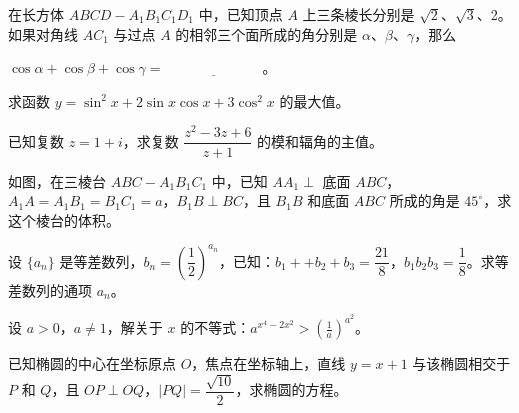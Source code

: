 \begin{question}

在长方体 $ABCD-A_1B_1C_1D_1$ 中，已知顶点 $A$ 上三条棱长分别是 $\sqrt2$、$\sqrt3$、2。如果对角线 $AC_1$ 与过点 $A$ 的相邻三个面所成的角分别是 $\alpha$、$\beta$、$\gamma$，那么

$\cos\alpha+\cos\beta+\cos\gamma=\underline{\hspace{7em}}$。

\end{question}
\begin{question}

求函数 $y=\sin^2x+2\sin x\cos x+3\cos^2x$ 的最大值。

\end{question}
\begin{question}

已知复数 $z=1+i$，求复数 $\dfrac{z^2-3z+6}{z+1}$ 的模和辐角的主值。

\Needspace{0.4\textheight}
\end{question}
\begin{question}

如图，在三棱台 $ABC-A_1B_1C_1$ 中，已知 $AA_1\perp$ 底面 $ABC$，$A_1A=A_1B_1=B_1C_1=a$，$B_1B\perp BC$，且 $B_1B$ 和底面 $ABC$ 所成的角是 $45^\circ$，求这个棱台的体积。
\nopagebreak[4]
\begin{center}\end{center}
\nopagebreak[4]
\end{question}
\begin{question}

设 $\{a_n\}$ 是等差数列，$b_n=\left(\dfrac12\right)^{a_n}$，已知：$b_1 + +b_2+b_3=\dfrac{21}{8}$，$b_1b_2b_3=\dfrac18$。求等差数列的通项 $a_n$。

\end{question}
\begin{question}

设 $a>0$，$a\ne1$，解关于 $x$ 的不等式：$a^{x^4-2x^2}>\left(\frac1a\right)^{a^2}$。

\end{question}
\begin{question}

已知椭圆的中心在坐标原点 $O$，焦点在坐标轴上，直线 $y=x+1$ 与该椭圆相交于 $P$ 和 $Q$，且 $OP\perp OQ$，$|PQ|=\dfrac{\sqrt{10}}2$，求椭圆的方程。

\end{question}